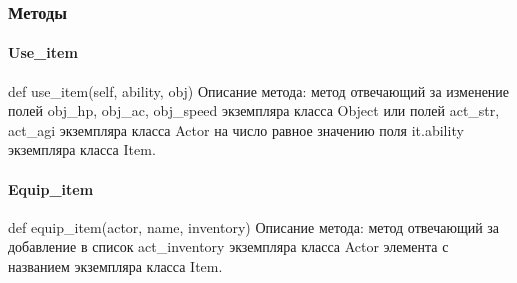 \subsubsection{Методы}
\paragraph{Use\_item}
def use\_item(self, ability, obj)
Описание метода: метод отвечающий за изменение полей obj\_hp, obj\_ac, obj\_speed экземпляра класса Object или полей act\_str, act\_agi экземпляра класса Actor на число равное значению поля it.ability экземпляра класса Item.
\paragraph{Equip\_item}
def equip\_item(actor, name, inventory)
Описание метода: метод отвечающий за добавление в список act\_inventory экземпляра класса Actor элемента с названием экземпляра класса Item.

